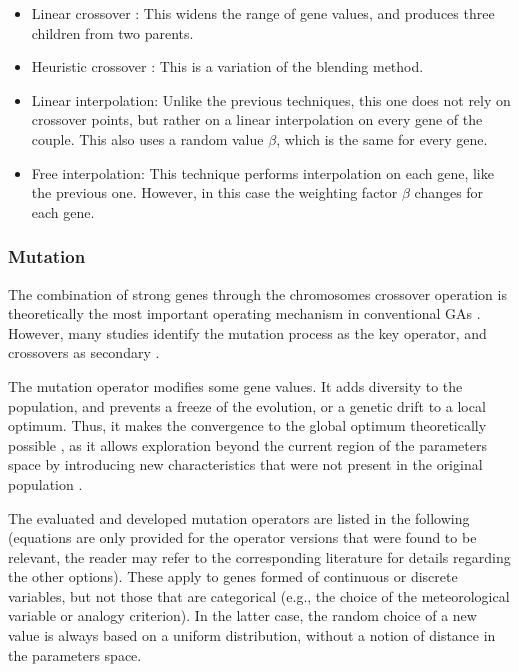 \documentclass{ametsoc}
\begin{document}
\begin{itemize}
	\item Linear crossover \citep{Wright1991a}: This widens the range of gene values, and produces three children from two parents.
	
	\item Heuristic crossover \citep{Michalewicz1996}: This is a variation of the blending method.
	
	\item Linear interpolation: Unlike the previous techniques, this one does not rely on crossover points, but rather on a linear interpolation on every gene of the couple. This also uses a random value $\beta$, which is the same for every gene.
	
	\item Free interpolation: This technique performs interpolation on each gene, like the previous one. However, in this case the weighting factor $\beta$ changes for each gene.
	
\end{itemize}


\subsubsection{Mutation}
\label{sec:gas:mutation}

The combination of strong genes through the chromosomes crossover operation is theoretically the most important operating mechanism in conventional GAs \citep{Holland1992b,Back1993b}. However, many studies identify the mutation process as the key operator, and crossovers as secondary \citep[see][]{Back1992a, Back1996a, Back1996b, Smith1997a, Deb1999, Costa2005a, Costa2007a}.

The mutation operator modifies some gene values. It adds diversity to the population, and prevents a freeze of the evolution, or a genetic drift to a local optimum. Thus, it makes the convergence to the global optimum theoretically possible \citep{Beasley1993a}, as it allows exploration beyond the current region of the parameters space by introducing new characteristics that were not present in the original population \citep{Haupt2004}. 

The evaluated and developed mutation operators are listed in the following (equations are only provided for the operator versions that were found to be relevant, the reader may refer to the corresponding literature for details regarding the other options). These apply to genes formed of continuous or discrete variables, but not those that are categorical (e.g., the choice of the meteorological variable or analogy criterion). In the latter case, the random choice of a new value is always based on a uniform distribution, without a notion of distance in the parameters space.
\end{document}
